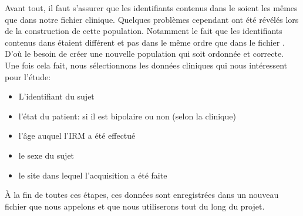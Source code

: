 Avant tout, il faut s'assurer que les identifiants contenus dans le  soient les mêmes que dans notre fichier clinique.
Quelques problèmes cependant ont été révélés lors de la construction de cette population. Notamment le fait que les identifiants contenus dans  étaient différent et pas dans le même ordre que dans le fichier .
D'où le besoin de créer une nouvelle population qui soit ordonnée et correcte. 
Une fois cela fait, nous sélectionnons les données cliniques qui nous intéressent pour l'étude:
\begin{itemize}
	\item L'identifiant du sujet
	\item l'état du patient: si il est bipolaire ou non (selon la clinique)
	\item l'âge auquel l'IRM a été effectué
	\item le sexe du sujet
	\item le site dans lequel l'acquisition a été faite 
\end{itemize}

À la fin de toutes ces étapes, ces données sont enregistrées dans un nouveau fichier que nous appelons  et que nous utiliserons tout du long du projet.

